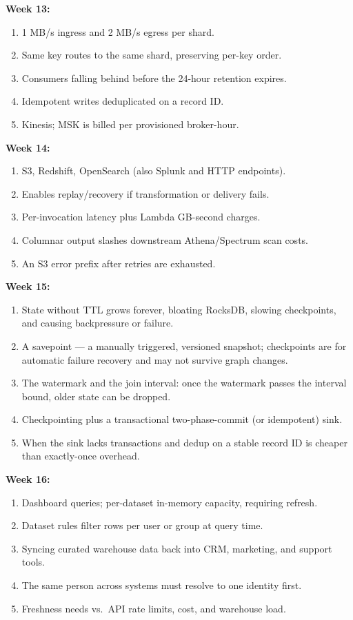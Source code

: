 \documentclass[11pt, a4paper]{article}
\begin{document}
\noindent\textbf{Week 13:}
\begin{enumerate}[itemsep=0pt, leftmargin=2em]
    \item 1 MB/s ingress and 2 MB/s egress per shard.
    \item Same key routes to the same shard, preserving per-key order.
    \item Consumers falling behind before the 24-hour retention expires.
    \item Idempotent writes deduplicated on a record ID.
    \item Kinesis; MSK is billed per provisioned broker-hour.
\end{enumerate}
\noindent\textbf{Week 14:}
\begin{enumerate}[itemsep=0pt, leftmargin=2em]
    \item S3, Redshift, OpenSearch (also Splunk and HTTP endpoints).
    \item Enables replay/recovery if transformation or delivery fails.
    \item Per-invocation latency plus Lambda GB-second charges.
    \item Columnar output slashes downstream Athena/Spectrum scan costs.
    \item An S3 error prefix after retries are exhausted.
\end{enumerate}
\noindent\textbf{Week 15:}
\begin{enumerate}[itemsep=0pt, leftmargin=2em]
    \item State without TTL grows forever, bloating RocksDB, slowing checkpoints, and causing backpressure or failure.
    \item A savepoint --- a manually triggered, versioned snapshot; checkpoints are for automatic failure recovery and may not survive graph changes.
    \item The watermark and the join interval: once the watermark passes the interval bound, older state can be dropped.
    \item Checkpointing plus a transactional two-phase-commit (or idempotent) sink.
    \item When the sink lacks transactions and dedup on a stable record ID is cheaper than exactly-once overhead.
\end{enumerate}
\noindent\textbf{Week 16:}
\begin{enumerate}[itemsep=0pt, leftmargin=2em]
    \item Dashboard queries; per-dataset in-memory capacity, requiring refresh.
    \item Dataset rules filter rows per user or group at query time.
    \item Syncing curated warehouse data back into CRM, marketing, and support tools.
    \item The same person across systems must resolve to one identity first.
    \item Freshness needs vs.\ API rate limits, cost, and warehouse load.
\end{enumerate}
\end{document}
